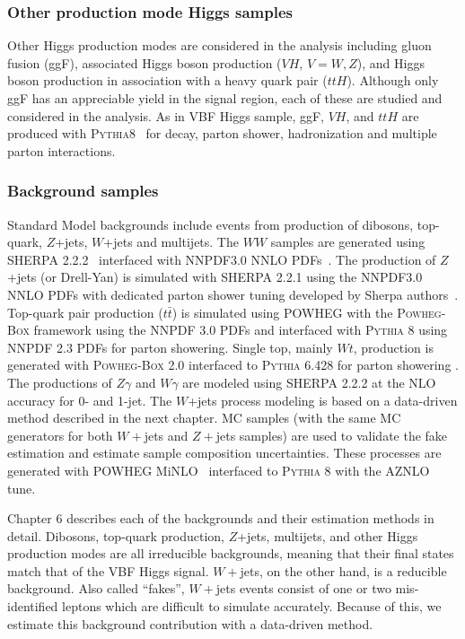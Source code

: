 \subsubsection{Other production mode Higgs samples}

Other Higgs production modes are considered in the analysis including gluon fusion (ggF), associated Higgs boson production ($VH$, $V=W,Z$), and Higgs boson production in association with a heavy quark pair ($ttH$). Although only ggF has an appreciable yield in the signal region, each of these are studied and considered in the analysis. As in VBF Higgs sample, ggF, $VH$, and $ttH$ are produced with \textsc{Pythia8}~\cite{pythia,Sjostrand:2007gs} for decay, parton shower, hadronization and multiple parton interactions.
 
\subsubsection{Background samples}
\label{sec:bkgMC}

Standard Model backgrounds include events from production of dibosons, top-quark, $Z$+jets, $W$+jets and multijets. The $WW$ samples are generated using \textsc{SHERPA} 2.2.2~\cite{Sherpa} interfaced with NNPDF3.0 NNLO PDFs~\cite{NNPDF}. The production of $Z$+jets (or Drell-Yan) is simulated with \textsc{SHERPA} 2.2.1 using the NNPDF3.0 NNLO PDFs with dedicated parton shower tuning developed by Sherpa authors~\cite{Sherpa}. Top-quark pair production ($t\bar{t}$) is simulated using \textsc{POWHEG} with the \textsc{Powheg-Box} framework using the NNPDF 3.0 PDFs and interfaced with \textsc{Pythia 8} using NNPDF 2.3 PDFs for parton showering. Single top, mainly $Wt$, production is generated with \textsc{Powheg-Box} 2.0 interfaced to \textsc{Pythia} 6.428 for parton showering \cite{pythia6}. The productions of $Z\gamma$ and $W\gamma$ are modeled using \textsc{SHERPA} 2.2.2 at the NLO accuracy for 0- and 1-jet. The $W$+jets process modeling is based on a data-driven method described in the next chapter. MC samples (with the same MC generators for both $W+$jets and $Z+$jets samples) are used to validate the fake estimation and estimate sample composition uncertainties. These processes are generated with \textsc{POWHEG} MiNLO~\cite{MILNO} interfaced to \textsc{Pythia 8} with the AZNLO tune. 

Chapter 6 describes each of the backgrounds and their estimation methods in detail. Dibosons, top-quark production, $Z$+jets, multijets, and other Higgs production modes are all irreducible backgrounds, meaning that their final states match that of the VBF Higgs signal. $W+$jets, on the other hand, is a reducible background. Also called ``fakes'', $W+$jets events consist of one or two mis-identified leptons which are difficult to simulate accurately. Because of this, we estimate this background contribution with a data-driven method.

